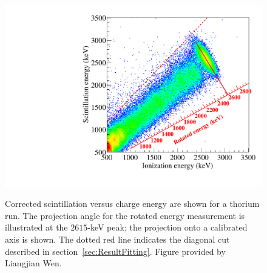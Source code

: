 \begin{figure}
\begin{center}
\includegraphics[keepaspectratio=true,width=\textwidth]{RotationTh2D_withCalibration.pdf}
\end{center}
\renewcommand{\baselinestretch}{1}
\small\normalsize
\begin{quote}
\caption{Corrected scintillation versus charge energy are shown for a thorium run.  The projection angle for the rotated energy measurement is illustrated at the $2615$-keV peak; the projection onto a calibrated axis is shown.  The dotted red line indicates the diagonal cut described in section~\ref{sec:ResultFitting}.  Figure provided by Liangjian Wen.}
\label{fig:LiangjianAnticorrelatedEnergy}
\end{quote}
\end{figure}
\renewcommand{\baselinestretch}{2}
\small\normalsize

